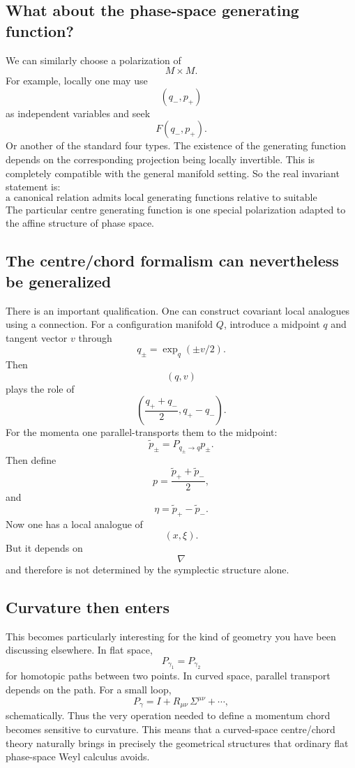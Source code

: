 \subsection{What about the phase-space generating function?}
We can similarly choose a polarization of
$$ M\times M. $$
For example, locally one may use
$$ (q_-,p_+) $$
as independent variables and seek
$$ F(q_-,p_+). $$
Or another of the standard four types.
The existence of the generating function depends on the corresponding
projection being locally invertible.
This is completely compatible with the general manifold setting.
So the real invariant statement is:
$$ \boxed{ \text{a canonical relation admits local generating functions
relative to suitable polarizations.} } $$
The particular centre generating function is one special polarization adapted
to the affine structure of phase space.

\subsection{The centre/chord formalism can nevertheless be generalized}
There is an important qualification.
One can construct covariant local analogues using a connection.
For a configuration manifold \(Q\), introduce a midpoint \(q\) and tangent
vector \(v\) through
$$ q_\pm = \exp_q(\pm v/2). $$
Then
$$ (q,v) $$
plays the role of
$$ \left( \frac{q_++q_-}{2}, q_+-q_- \right). $$
For the momenta one parallel-transports them to the midpoint:
$$ \tilde p_\pm = P_{q_\pm\to q}p_\pm. $$
Then define
$$ p=\frac{\tilde p_++\tilde p_-}{2}, $$
and
$$ \eta=\tilde p_+-\tilde p_-. $$
Now one has a local analogue of
$$ (x,\xi). $$
But it depends on
$$ \boxed{\nabla} $$
and therefore is not determined by the symplectic structure alone.

\subsection{Curvature then enters}
This becomes particularly interesting for the kind of geometry you have been
discussing elsewhere.
In flat space,
$$ P_{\gamma_1}=P_{\gamma_2} $$
for homotopic paths between two points.
In curved space, parallel transport depends on the path.
For a small loop,
$$ P_\gamma = I+R_{\mu\nu}\,\Sigma^{\mu\nu} +\cdots, $$
schematically.
Thus the very operation needed to define a momentum chord becomes sensitive to
curvature.
This means that a curved-space centre/chord theory naturally brings in
precisely the geometrical structures that ordinary flat phase-space Weyl
calculus avoids.

